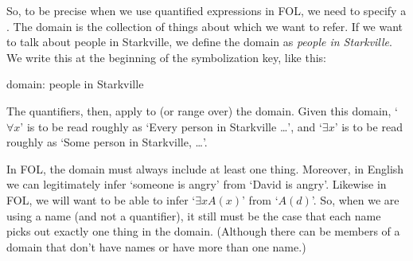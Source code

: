 So, to be precise when we use quantified expressions in FOL, we need to specify a . The domain is the collection of things about which we want to refer. If we want to talk about people in Starkville, we define the domain as \textit{people in Starkville}. We write this at the beginning of the symbolization key, like this:

\begin{earg}
\item[] domain: people in Starkville
\end{earg}
The quantifiers, then, apply to (or range over) the domain. Given this domain, ‘$\forall x$’ is to be read roughly as ‘Every person in Starkville \ldots ’, and ‘$\exists x$’ is to be read roughly as ‘Some person in Starkville, \ldots ’.

In FOL, the domain must always include at least one thing. Moreover, in English we can legitimately infer ‘someone is angry’ from ‘David is angry’. Likewise in FOL, we will want to be able to infer ‘$\exists xA(x)$’ from ‘$A(d)$’. So, when we are using a name (and not a quantifier), it still must be the case that each name picks out exactly one thing in the domain. (Although there can be members of a domain that don’t have names or have more than one name.)




